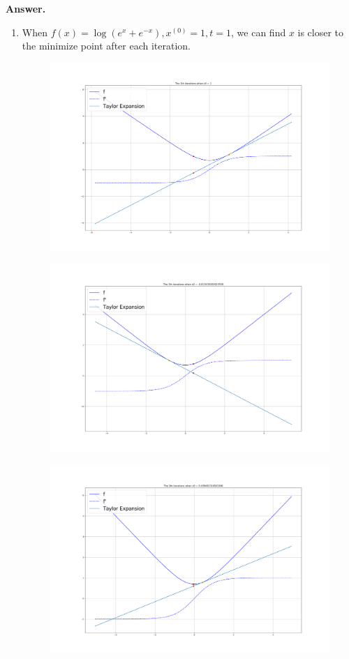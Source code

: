 \documentclass{article}
\theoremstyle{definition}
\theoremstyle{definition}
\theoremstyle{remark}
\begin{document}
{\bf{Answer.}}
\begin{enumerate}
    \item When $f(x)=\log(e^x+e^{-x}),x^{(0)} = 1,t = 1$, we can find $x$ is closer to the minimize point after each iteration.
    \begin{figure}[H]
        \centering
        \includegraphics[scale=0.25]{f11.png}
    \end{figure}
    \begin{figure}[H]
        \centering
        \includegraphics[scale=0.25]{f12.png}
    \end{figure}
    \begin{figure}[H]
        \centering
        \includegraphics[scale=0.25]{f13.png}

\end{figure}
\end{enumerate}
\end{document}
